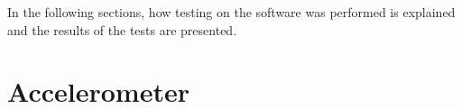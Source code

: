 In the following sections, how testing on the software was performed is explained and the results of the tests are presented. 
\section{Accelerometer}


